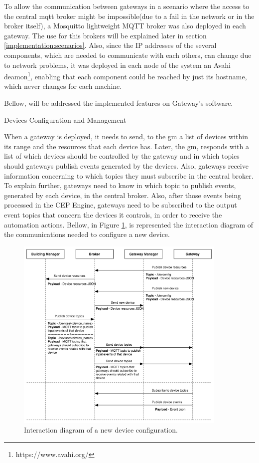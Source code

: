 To allow the communication between gateways in a scenario where the access to the central \ac{mqtt} broker might be impossible(due to a fail in the network or in the broker itself), a Mosquitto lightweight MQTT broker was also deployed in each gateway. The use for this brokers will be explained later in section \ref{implementation:scenarios}. Also, since the IP addresses of the several components, which are needed to communicate with each others, can change due to network problems, it was deployed in each node of the system an Avahi deamon\footnote{https://www.avahi.org/}, enabling that each component could be reached by just its hostname, which never changes for each machine.

Bellow, will be addressed the implemented features on Gateway's software.

\begin{Paragraph}{Devices Configuration and Management}

When a gateway is deployed, it needs to send, to the \ac{gm} a list of devices within its range and the resources that each device has. Later, the \ac{gm}, responds with a list of which devices should be controlled by the gateway and in which topics should gateways publish events generated by the devices. Also, gateways receive information concerning to which topics they must subscribe in the central broker. To explain further, gateways need to know in which topic to publish events, generated by each device, in the central broker. Also, after those events being processed in the CEP Engine, gateways need to be subscribed to the output event topics that concern the devices it controls, in order to receive the automation actions. Bellow, in Figure \ref{fig:newdevice}, is represented the interaction diagram of the communications needed to configure a new device. 


\begin{figure}[H]
	\centering
	\includegraphics[width=0.9\textwidth]{figures/newdevice.png}
	\caption{Interaction diagram of a new device configuration.}
	\label{fig:newdevice}
\end{figure}


	
\end{Paragraph}

